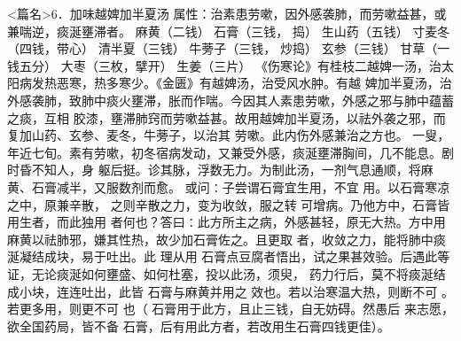 \documentclass[a4paper,12pt,UTF8,twoside]{ctexbook}
\begin{document}
<篇名>6．加味越婢加半夏汤
属性：治素患劳嗽，因外感袭肺，而劳嗽益甚，或兼喘逆，痰涎壅滞者。 
麻黄（二钱） 石膏（三钱， 捣） 生山药（五钱） 寸麦冬（四钱，带心） 清半夏（三钱） 牛蒡子（三钱， 
炒捣） 
玄参（三钱） 甘草（一钱五分） 大枣（三枚，擘开） 生姜（三片） 
《伤寒论》有桂枝二越婢一汤，治太阳病发热恶寒，热多寒少。《金匮》有越婢汤，治受风水肿。有越 
婢加半夏汤，治外感袭肺，致肺中痰火壅滞，胀而作喘。今因其人素患劳嗽，外感之邪与肺中蕴蓄之痰，互相 
胶漆，壅滞肺窍而劳嗽益甚。故用越婢加半夏汤，以祛外袭之邪，而复加山药、玄参、麦冬，牛蒡子，以治其 
劳嗽。此内伤外感兼治之方也。 
一叟，年近七旬。素有劳嗽，初冬宿病发动，又兼受外感，痰涎壅滞胸间，几不能息。剧时昏不知人，身 
躯后挺。诊其脉，浮数无力。为制此汤，一剂气息通顺，将麻黄、石膏减半，又服数剂而愈。 
或问∶子尝谓石膏宜生用，不宜 用。以石膏寒凉之中，原兼辛散， 之则辛散之力，变为收敛，服之转 
可增病。乃他方中，石膏皆用生者，而此独用 者何也？答曰∶此方所主之病，外感甚轻，原无大热。方中用 
麻黄以祛肺邪，嫌其性热，故少加石膏佐之。且更取 者，收敛之力，能将肺中痰涎凝结成块，易于吐出。此 
理从用 石膏点豆腐者悟出，试之果甚效验。后遇此等证，无论痰涎如何壅盛、如何杜塞，投以此汤，须臾， 
药力行后，莫不将痰涎结成小块，连连吐出，此皆 石膏与麻黄并用之 
效也。若以治寒温大热，则断不可 。若更多用，则更不可 也（ 石膏用于此方，且止三钱，自无妨碍。然愚后 
来志愿，欲全国药局，皆不备 石膏，后有用此方者，若改用生石膏四钱更佳）。 
\end{document}
